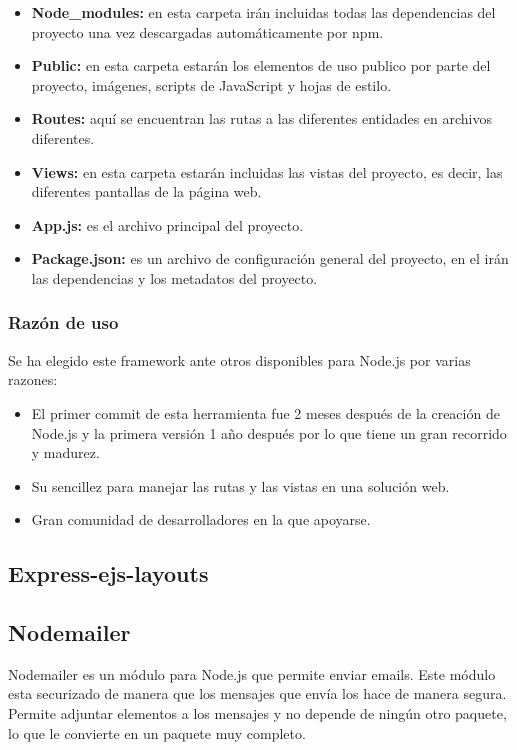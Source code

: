 \begin{itemize}
	\item \textbf{Node\_modules:} en esta carpeta irán incluidas todas las dependencias del proyecto una vez descargadas automáticamente por npm.
	\item \textbf{Public:} en esta carpeta estarán los elementos de uso publico por parte del proyecto, imágenes, scripts de JavaScript y hojas de estilo.
	\item \textbf{Routes:} aquí se encuentran las rutas a las diferentes entidades en archivos diferentes.
	\item \textbf{Views:} en esta carpeta estarán incluidas las vistas del proyecto, es decir, las diferentes pantallas de la página web.
	\item \textbf{App.js:} es el archivo principal del proyecto.
	\item \textbf{Package.json:} es un archivo de configuración general del proyecto, en el irán las dependencias y los metadatos del proyecto.
\end{itemize}

\subsubsection{Razón de uso}
Se ha elegido este framework ante otros disponibles para Node.js por varias razones:

\begin{itemize}
	\item El primer commit de esta herramienta fue 2 meses después de la creación de Node.js y la primera versión 1 año después por lo que tiene un gran recorrido y madurez.
	\item Su sencillez para manejar las rutas y las vistas en una solución web.
	\item Gran comunidad de desarrolladores en la que apoyarse.
\end{itemize}

\subsection{Express-ejs-layouts}

\subsection{Nodemailer}
Nodemailer es un módulo para Node.js que permite enviar emails. Este módulo esta securizado de manera que los mensajes que envía los hace de manera segura. Permite adjuntar elementos a los mensajes y no depende de ningún otro paquete, lo que le convierte en un paquete muy completo.

